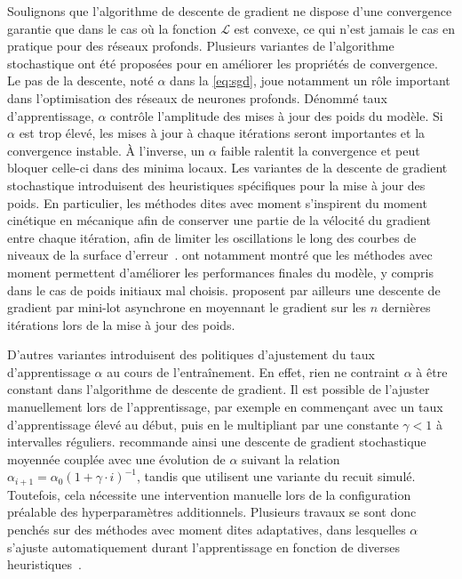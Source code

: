Soulignons que l'algorithme de descente de gradient ne dispose d'une convergence garantie que dans le cas où la fonction $\mathcal{L}$ est convexe, ce qui n'est jamais le cas en pratique pour des réseaux profonds. Plusieurs variantes de l'algorithme stochastique ont été proposées pour en améliorer les propriétés de convergence. Le pas de la descente, noté $\alpha$ dans la \cref{eq:sgd}, joue notamment un rôle important dans l'optimisation des réseaux de neurones profonds. Dénommé taux d'apprentissage, $\alpha$ contrôle l'amplitude des mises à jour des poids du modèle. Si $\alpha$ est trop élevé, les mises à jour à chaque itérations seront importantes et la convergence instable. À l'inverse, un $\alpha$ faible ralentit la convergence et peut bloquer celle-ci dans des minima locaux. Les variantes de la descente de gradient stochastique introduisent des heuristiques spécifiques pour la mise à jour des poids. En particulier, les méthodes dites avec \og moment \fg s'inspirent du moment cinétique en mécanique afin de conserver une partie de la vélocité du gradient entre chaque itération, afin de limiter les oscillations le long des courbes de niveaux de la surface d'erreur~\cite{qian_momentum_1999,nesterov_method_1983}. \citet{sutskever_importance_2013} ont notamment montré que les méthodes avec moment permettent d'améliorer les performances finales du modèle, y compris dans le cas de poids initiaux mal choisis. \citet{polyak_acceleration_1992} proposent par ailleurs une descente de gradient par mini-lot asynchrone en moyennant le gradient sur les $n$ dernières itérations lors de la mise à jour des poids.

D'autres variantes introduisent des politiques d'ajustement du taux d'apprentissage $\alpha$ au cours de l'entraînement. En effet, rien ne contraint $\alpha$ à être constant dans l'algorithme de descente de gradient. Il est possible de l'ajuster manuellement lors de l'apprentissage, par exemple en commençant avec un taux d'apprentissage élevé au début, puis en le multipliant par une constante $\gamma < 1$ à intervalles réguliers. \citet{bottou_stochastic_2012} recommande ainsi une descente de gradient stochastique moyennée couplée avec une évolution de $\alpha$ suivant la relation $\alpha_{i+1} = \alpha_0 (1 + \gamma \cdot i)^{-1}$, tandis que \citet{loshchilov_sgdr_2016} utilisent une variante du recuit simulé. Toutefois, cela nécessite une intervention manuelle lors de la configuration préalable des hyperparamètres additionnels. Plusieurs travaux se sont donc penchés sur des méthodes avec moment dites adaptatives, dans lesquelles $\alpha$ s'ajuste automatiquement durant l'apprentissage en fonction de diverses heuristiques~\cite{duchi_adaptive_2011,tielman_lecture_2012,zeiler_adadelta_2012,kingma_adam_2014}.

